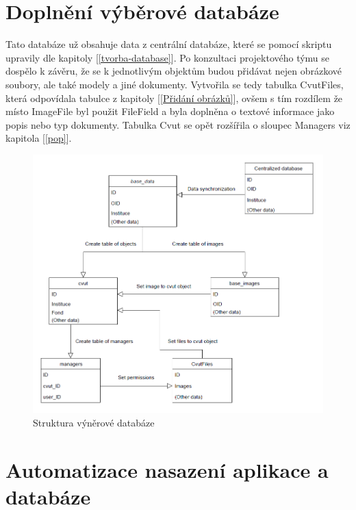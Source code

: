 \section{Doplnění výběrové databáze}

Tato databáze už obsahuje data z centrální databáze, které se pomocí
skriptu upra\-vily dle kapitoly [\ref{tvorba-database}]. Po konzultaci
projektového týmu se dospělo k závěru, že se k jednotlivým objektům
budou přidávat nejen obrázkové soubory, ale také modely a jiné
dokumenty. Vytvořila se tedy tabulka CvutFiles, která odpovídala
tabulce z kapitoly [\ref{Přidání obrázků}], ovšem s tím rozdílem že místo
ImageFile byl použit FileField a byla doplněna o textové informace
jako popis nebo typ dokumenty. Tabulka Cvut se opět rozšířila o
sloupec Managers viz kapitola [\ref{pop}].

\begin{figure}[H] \centering
    \includegraphics[width=400pt]{./pictures/23-db-diagram-2.PNG}
    \caption[Struktura výběrové databáze]{Struktura výněrové databáze}
	\label{fig:Struktura výběrové databáze}              
\end{figure}

\newpage

\section{Automatizace nasazení aplikace a databáze}


